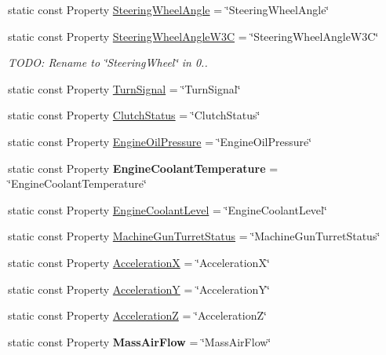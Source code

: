 \begin{DoxyCompactItemize}
\item 
static const Property \hyperlink{classVehicleProperty_aba4832663e4f850acbcf09c7cfbc6959}{Steering\-Wheel\-Angle} = \char`\"{}Steering\-Wheel\-Angle\char`\"{}
\item 
static const Property \hyperlink{classVehicleProperty_afb3708166c9863053de47a7dfcd0a09e}{Steering\-Wheel\-Angle\-W3\-C} = \char`\"{}Steering\-Wheel\-Angle\-W3\-C\char`\"{}
\begin{DoxyCompactList}\small\item\em T\-O\-D\-O\-: Rename to \char`\"{}\-Steering\-Wheel\char`\"{} in 0.. \end{DoxyCompactList}\item 
static const Property \hyperlink{classVehicleProperty_a0aae609c370a46a92dc52a31d2cc0310}{Turn\-Signal} = \char`\"{}Turn\-Signal\char`\"{}
\item 
static const Property \hyperlink{classVehicleProperty_acdca2ca718fd392c7ad9b8adc817baec}{Clutch\-Status} = \char`\"{}Clutch\-Status\char`\"{}
\item 
static const Property \hyperlink{classVehicleProperty_ab7fad273c7149dbd338f53f2536aca26}{Engine\-Oil\-Pressure} = \char`\"{}Engine\-Oil\-Pressure\char`\"{}
\item 
\hypertarget{classVehicleProperty_ae4f240ad9cecbbb9d0cb3a615865b60a}{static const Property {\bfseries Engine\-Coolant\-Temperature} = \char`\"{}Engine\-Coolant\-Temperature\char`\"{}}\label{classVehicleProperty_ae4f240ad9cecbbb9d0cb3a615865b60a}

\item 
static const Property \hyperlink{classVehicleProperty_aac38e43b1c1ec7239252dfafe6d19d87}{Engine\-Coolant\-Level} = \char`\"{}Engine\-Coolant\-Level\char`\"{}
\item 
static const Property \hyperlink{classVehicleProperty_a8b9faaa1094c2d162ed171a3063b7ffc}{Machine\-Gun\-Turret\-Status} = \char`\"{}Machine\-Gun\-Turret\-Status\char`\"{}
\item 
static const Property \hyperlink{classVehicleProperty_a94eac12d319850190e9ece93690517f7}{Acceleration\-X} = \char`\"{}Acceleration\-X\char`\"{}
\item 
static const Property \hyperlink{classVehicleProperty_af56803eeb7710aeae2954f4cd9b66cf6}{Acceleration\-Y} = \char`\"{}Acceleration\-Y\char`\"{}
\item 
static const Property \hyperlink{classVehicleProperty_a1ce0b3be3a09d5a96741890d0d67496f}{Acceleration\-Z} = \char`\"{}Acceleration\-Z\char`\"{}
\item 
\hypertarget{classVehicleProperty_aabc6b6b50b8a31bfe197cbd3ae0827a1}{static const Property {\bfseries Mass\-Air\-Flow} = \char`\"{}Mass\-Air\-Flow\char`\"{}}\label{classVehicleProperty_aabc6b6b50b8a31bfe197cbd3ae0827a1}


\end{DoxyCompactItemize}
